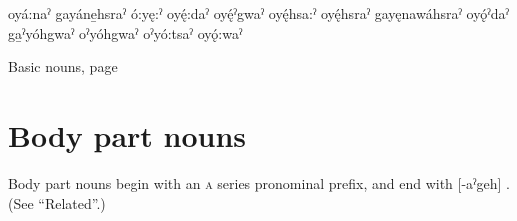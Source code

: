 \begin{multicols}{2}
 oyá:naˀ 
 gayáne̱hsraˀ 
 ó:yę:ˀ 
 oyę́:daˀ 
 oyę́ˀgwaˀ 
 oyę́hsa:ˀ 
 oyę́hsraˀ 
 gayęnawáhsraˀ 
 oyǫ́ˀdaˀ 
 ga̱ˀyóhgwaˀ 
 oˀyóhgwaˀ 
 oˀyó:tsaˀ 
 oyǫ́:waˀ 

\end{multicols}

\begin{CayugaRelated}
\item  Basic nouns, page \pageref{ch:Basic nouns}
\end{CayugaRelated}

\section{Body part nouns} \label{ch:list of body part nouns}

Body part nouns begin with an \textsc{a} series pronominal prefix, and end with [-aˀgeh] . (See “Related”.)

